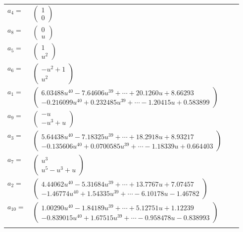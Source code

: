 \documentclass[1p]{elsarticle_modified}
\theoremstyle{definition}
\begin{document}
\begin{tabular}{m{7pt} m{180pt} m{7pt} m{180pt} }
\flushright $a_{4}=$&$\begin{pmatrix}1\\0\end{pmatrix}$ \\
\flushright $a_{8}=$&$\begin{pmatrix}0\\u\end{pmatrix}$ \\
\flushright $a_{5}=$&$\begin{pmatrix}1\\u^2\end{pmatrix}$ \\
\flushright $a_{6}=$&$\begin{pmatrix}- u^2+1\\u^2\end{pmatrix}$ \\
\flushright $a_{1}=$&$\begin{pmatrix}6.03488 u^{40}-7.64606 u^{39}+\cdots+20.1260 u+8.66293\\-0.216099 u^{40}+0.232485 u^{39}+\cdots-1.20415 u+0.583899\end{pmatrix}$ \\
\flushright $a_{9}=$&$\begin{pmatrix}- u\\- u^3+u\end{pmatrix}$ \\
\flushright $a_{3}=$&$\begin{pmatrix}5.64438 u^{40}-7.18325 u^{39}+\cdots+18.2918 u+8.93217\\-0.135606 u^{40}+0.0700585 u^{39}+\cdots-1.18339 u+0.664403\end{pmatrix}$ \\
\flushright $a_{7}=$&$\begin{pmatrix}u^3\\u^5- u^3+u\end{pmatrix}$ \\
\flushright $a_{2}=$&$\begin{pmatrix}4.44062 u^{40}-5.31684 u^{39}+\cdots+13.7767 u+7.07457\\-1.46774 u^{40}+1.54335 u^{39}+\cdots-6.10178 u-1.46782\end{pmatrix}$ \\
\flushright $a_{10}=$&$\begin{pmatrix}1.00290 u^{40}-1.84189 u^{39}+\cdots+5.12751 u+1.12239\\-0.839015 u^{40}+1.67515 u^{39}+\cdots-0.958478 u-0.838993\end{pmatrix}$\\&\end{tabular}
\end{document}
